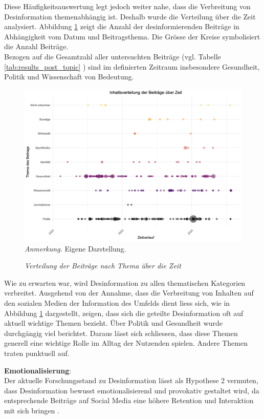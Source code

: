 \documentclass[12pt,a4paper]{article}        %
\begin{document}
Diese Häufigkeitsauswertung legt jedoch weiter nahe, dass die Verbreitung von Desinformation themenabhängig ist. Deshalb wurde die Verteilung über die Zeit analysiert. Abbildung \ref{fig:results_date_dependency} zeigt die Anzahl der desinformierenden Beiträge in Abhängigkeit vom Datum und Beitragsthema. Die Grösse der Kreise symbolisiert die Anzahl Beiträge. \\
Bezogen auf die Gesamtzahl aller untersuchten Beiträge (vgl. Tabelle \ref{tab:results_post_topic}  ) sind im definierten Zeitraum insbesondere Gesundheit, Politik und Wissenschaft von Bedeutung.
\begin{figure}[H]
  \caption{\textit{Verteilung der Beiträge nach Thema über die Zeit}}
  \label{fig:results_date_dependency}
  \centering
  \includegraphics[width=1\linewidth]{images/date_dependency_plot.png}
  \footnotesize\textit{Anmerkung.} Eigene Darstellung.
\end{figure}

Wie zu erwarten war, wird Desinformation zu allen thematischen Kategorien verbreitet. Ausgehend von der Annahme, dass die Verbreitung von Inhalten auf den sozialen Medien der Information des Umfelds dient \parencites[77]{lecheler_disinformation_2022}{subramanian_meet_2017} liess sich, wie in Abbildung \ref{fig:results_date_dependency} dargestellt, zeigen, dass sich die geteilte Desinformation oft auf  aktuell wichtige Themen bezieht.
Über Politik und Gesundheit wurde durchgängig viel berichtet. Daraus lässt sich schliessen, dass diese Themen generell eine wichtige Rolle im Alltag der Nutzenden spielen. Andere Themen traten punktuell auf.

\textbf{Emotionalisierung}:\\
Der aktuelle Forschungsstand zu Desinformation lässt als Hypothese 2 vermuten, dass Desinformation bewusst emotionalisierend und provokativ gestaltet wird, da entsprechende Beiträge auf Social Media eine höhere Retention und Interaktion mit sich bringen \parencites[vgl.\ dazu][8]{burkhardt_history_2017}[42]{levak_disinformation_2020}[18]{grujic_warnhinweise_2024}[5]{tandoc_jr_facts_2019}[170]{wahl_fake_2021}.
\end{document}
